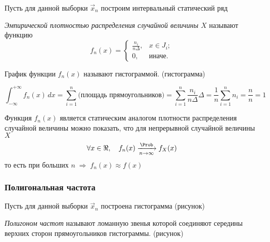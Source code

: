 Пусть для данной выборки $\vec{x}_n$ построим интервальный статический ряд

\begin{defn}
	\emph{Эмпирической плотностью распределения случайной величины $X$} называют функцию
	\begin{equation}
		f_n(x) =
		\begin{cases}
			\frac{n_i}{n \Delta}, &x \in J_i;\\
			0, &\text{иначе}.
		\end{cases}
	\end{equation}
\end{defn}

\begin{defn}
	График функции $f_n(x)$ называют гистограммой. (гистограмма)
\end{defn}

\begin{rem}
	\[
		\int_{-\infty}^{+\infty} f_n(x)\, dx = \sum_{i =1}^{n} \text{(площадь прямоугольников)} = \sum_{i = 1}^{n} \frac{n_i}{n \Delta} \Delta = \frac{1}{n} \sum_{i = 1}^{n} n_i = \frac{n}{n} = 1
	\]
\end{rem}
\begin{rem}
	Функция $f_n(x)$ является статическим аналогом плотности распределения случайной величины можно показать, что для непрерывной случайной величины $X$
	\[
		\forall x \in \Re, \quad f_n(x) \xrightarrow[n\to\infty]{\Prob} f_{X}(x)
	\]
	то есть при больших $n \;\Rightarrow\; f_n(x) \approx f(x)$
\end{rem}


\subsubsection{Полигональная частота}

Пусть для данной выборки $\vec{x}_n$ построена гистограмма (рисунок)

\begin{defn}
	\emph{Полигоном частот} называют ломанную звенья которой соединяют середины верхних сторон прямоугольников гистограммы. (рисунок)
\end{defn}